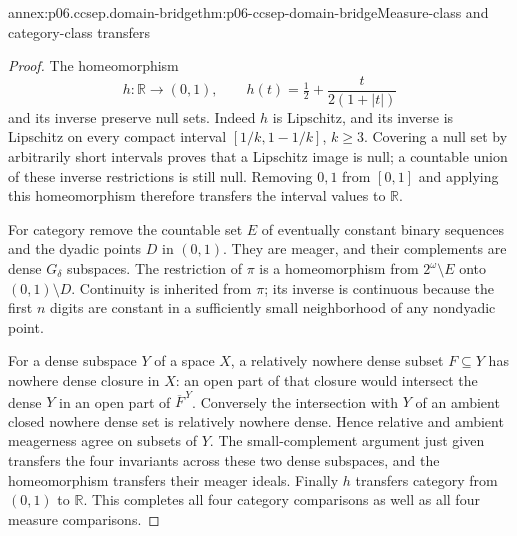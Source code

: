 \begin{annexitem}{annex:p06.ccsep.domain-bridge}{thm:p06-ccsep-domain-bridge}{Measure-class and category-class transfers}
\begin{proof}
The homeomorphism
\[
 h:\mathbb R\to(0,1),\qquad
 h(t)=\tfrac12+\frac{t}{2(1+|t|)}
\]
and its inverse preserve null sets. Indeed \(h\) is Lipschitz, and
its inverse is Lipschitz on every compact interval
\([1/k,1-1/k]\), \(k\geq3\). Covering a null set by arbitrarily
short intervals proves that a Lipschitz image is null; a countable
union of these inverse restrictions is still null. Removing \(0,1\)
from \([0,1]\) and applying this homeomorphism therefore transfers
the interval values to \(\mathbb R\).

For category remove the countable set \(E\) of eventually constant
binary sequences and the dyadic points \(D\) in \((0,1)\).
They are meager, and their complements are dense \(G_\delta\)
subspaces. The restriction of \(\pi\) is a homeomorphism from
\(2^\omega\setminus E\) onto \((0,1)\setminus D\).
Continuity is inherited from \(\pi\); its inverse is continuous
because the first \(n\) digits are constant in a sufficiently small
neighborhood of any nondyadic point.

For a dense subspace \(Y\) of a space \(X\), a relatively nowhere
dense subset \(F\subseteq Y\) has nowhere dense closure in \(X\):
an open part of that closure would intersect the dense \(Y\) in
an open part of \(\overline F^{\,Y}\). Conversely the intersection
with \(Y\) of an ambient closed nowhere dense set is relatively
nowhere dense. Hence relative and ambient meagerness agree on
subsets of \(Y\). The small-complement argument just given transfers
the four invariants across these two dense subspaces, and the
homeomorphism transfers their meager ideals. Finally \(h\) transfers
category from \((0,1)\) to \(\mathbb R\). This completes all
four category comparisons as well as all four measure comparisons.
\end{proof}
\end{annexitem}

